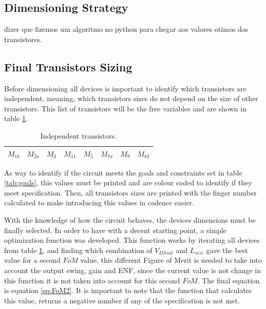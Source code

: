 \subsection{Dimensioning Strategy}

dizer que fizemos um algoritmo no python para chegar aos valores otimos dos transistores.

\subsection{Final Transistors Sizing}

Before dimensioning all devices is important to identify which transistors are independent, meaning, which transistors sizes do not depend on the size of other transistors. This list of transistors will be the free variables and are shown in table \ref{tab:FreeMos}.


\begin{table}[h]
    \centering
    \caption{Independent transistors.}
    \begin{tabularx}{\textwidth}{>{\centering\arraybackslash}X 
                                >{\centering\arraybackslash}X 
                                >{\centering\arraybackslash}X  
                                >{\centering\arraybackslash}X
                                >{\centering\arraybackslash}X
                                >{\centering\arraybackslash}X
                                >{\centering\arraybackslash}X
                                >{\centering\arraybackslash}X
        }
        \toprule
        $M_{1b}$ & $M_{2a}$ & $M_{3}$ & $M_{11}$ & $M_{5}$ & $M_{7a}$ & $M_{9}$ & $M_{b3}$ \\
        \bottomrule
    \end{tabularx}
    \label{tab:FreeMos}
\end{table}

As way to identify if the circuit meets the goals and constraints set in table \ref{tab:goals}, this values must be printed and are colour coded to identify if they meet specification. Then, all transistors sizes are printed with the finger number calculated to make introducing this values in cadence easier. 

With the knowledge of how the circuit behaves, the devices dimensions must be finally selected. In order to have with a decent starting point, a simple optimization function was developed. This function works by iterating all devices from table \ref{tab:FreeMos}, and finding which combination of $V_{DSsat}$ and $L_{size}$ gave the best value for a second $FoM$ value, this different Figure of Merit is needed to take into account the output swing, gain and ENF, since the current value is not change in this function it is not taken into account for this second $FoM$. The final equation is equation \ref{eq:FoM2}. It is important to note that the function that calculates this value, returns a negative number if any of the specification is not met.

